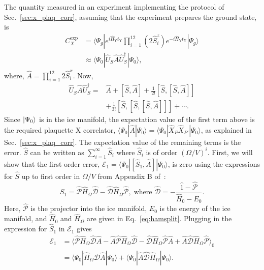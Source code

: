 \documentclass[twocolumn,superscriptaddress,amsmath,amssymb,aps,prx,nofootinbib]{revtex4-2}
\begin{document}
The quantity measured in an experiment implementing the protocol of Sec.~\ref{sec:x_plaq_corr}, assuming that the experiment prepares the ground state, is
\begin{align} 
    C_{X}^{\text{exp}} & =  \langle \Psi_g |  e^{i\hat{H}_{\text{Y}} t_{\text{Y}}} \prod_{i=1}^{12} (2 \hat{S}^z_i ) e^{-i\hat{H}_{\text{Y}} t_{\text{Y}}} | \Psi_g \rangle \nonumber\\
    & \approx    \langle \Psi_0 | \hat{U}_S \hat{A} \hat{U}_S^\dagger | \Psi_0 \rangle, \nonumber
\end{align}
where, $\hat{A} = \prod_{i=1}^{12} 2\hat{S}_i^x$. Now,
\begin{equation}
\begin{aligned}
\hat{U}_S \hat{A} \hat{U}_S^\dagger =& \hat{A} + \left[ \hat{S} , \hat{A} \right] + \frac{1}{2!} \left[  \hat{S} , \left[ \hat{S} ,\hat{A} \right]\right] \\
&+\frac{1}{3!} \left[ \hat{S} , \left[  \hat{S} , \left[ \hat{S} ,\hat{A} \right]\right]\right]+ \cdots .
\end{aligned}
\end{equation}
Since $\ket{\Psi_0}$ is in the ice manifold, the expectation value of the first term above is the required plaquette X correlator, $ \langle \Psi_0 | \hat{A} | \Psi_0 \rangle  = \langle \Psi_0 | \hat{X}_P \hat{X}_{P'} | \Psi_0 \rangle$,  as explained in Sec.~\ref{sec:x_plaq_corr}. The expectation value of the remaining terms is the error.
$\hat{S}$ can be written as $\sum_{i=1}^\infty \hat{S}_i$ where $\hat{S}_i$ is of order $( \Omega/V)^i$. First, we will show that the first order error, $\mathcal{E}_1 = \langle \Psi_0 | \left[ \hat{S}_1 , \hat{A} \right] | \Psi_0 \rangle $, is zero using the expressions for $\hat{S}$ up to first order in $\Omega/V$ from Appendix B of~\cite{slagle2022quantum}:
\begin{equation}
\label{eq:s_def}
\hat{S}_1 = \hat{\mathcal{P}} \hat{H}_\Omega \hat{\mathcal{{D}}}-\hat{\mathcal{D}} \hat{H}_\Omega \hat{\mathcal{P}}, \; \text{where } \hat{\mathcal{D}}=-\frac{\hat{1}-\hat{\mathcal{P}}}{\hat{H}_0-E_0}.
\end{equation}
Here, $\hat{\mathcal{P}}$ is the projector into the ice manifold, $E_0$ is the energy of the ice manifold, and $\hat{H}_0$ and $\hat{H}_\Omega$ are given in Eq.~\eqref{eq:hamsplit}.
Plugging in the expression for $\hat{S}_1$ in $\mathcal{E}_1$ gives
\begin{equation}
\begin{aligned}
\mathcal{E}_1 & = \langle \hat{\mathcal{P}} \hat{H}_\Omega \hat{\mathcal{{D}}} \hat{A}  -  \hat{A} \hat{\mathcal{P}} \hat{H}_\Omega \hat{\mathcal{{D}}}   -  \hat{\mathcal{D}} \hat{H}_\Omega \hat{\mathcal{P}} \hat{A}  +  \hat{A} \hat{\mathcal{D}} \hat{H}_\Omega \hat{\mathcal{P}}  \rangle_0\\
& =\langle \Psi_0 |  \hat{H}_\Omega \hat{\mathcal{{D}}} \hat{A} | \Psi_0 \rangle + \langle \Psi_0 | \hat{A} \hat{\mathcal{D}} \hat{H}_\Omega  | \Psi_0 \rangle.
\end{aligned}
\end{equation}
\end{document}
